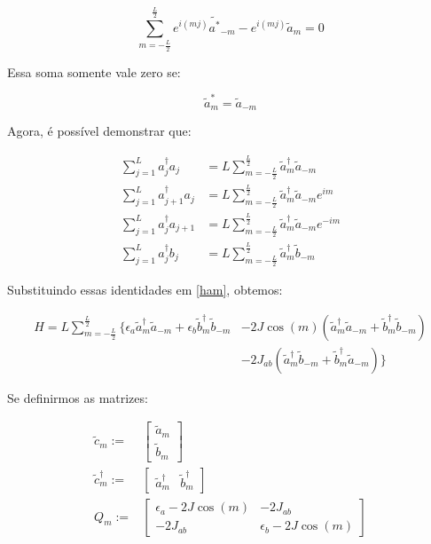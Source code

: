\begin{equation}
\sum_{m=-\frac{L}{2}}^{\frac{L}{2}} e^{i(mj)} \tilde{a^{*}}_{-m} - e^{i(mj)} \tilde{a}_m = 0
\end{equation}

Essa soma somente vale zero se:

\begin{equation}
\tilde{a}_{m}^* = \tilde{a}_{-m}
\end{equation}

Agora, é possível demonstrar que:

\begin{subequations}
\begin{align}
\sum_{j=1}^{L} a_{j}^{\dagger} a_{j} &= L\sum_{m=-\frac{L}{2}}^{\frac{L}{2}} \tilde{a}_{m}^{\dagger} \tilde{a}_{-m} \\
\sum_{j=1}^{L} a_{j+1}^{\dagger} a_{j} &= L\sum_{m=-\frac{L}{2}}^{\frac{L}{2}} \tilde{a}_{m}^{\dagger} \tilde{a}_{-m} e^{im} \\
\sum_{j=1}^{L} a_{j}^{\dagger} a_{j+1} &= L\sum_{m=-\frac{L}{2}}^{\frac{L}{2}} \tilde{a}_{m}^{\dagger} \tilde{a}_{-m} e^{-im} \\
\sum_{j=1}^{L} a_{j}^{\dagger} b_{j} &= L\sum_{m=-\frac{L}{2}}^{\frac{L}{2}} \tilde{a}_{m}^{\dagger} \tilde{b}_{-m}
\end{align}
\end{subequations}

Substituindo essas identidades em \eqref{ham}, obtemos:

\begin{equation}
\begin{split}
H = L \sum_{m=-\frac{L}{2}}^{\frac{L}{2}} \bigg\{ 
\epsilon_a \tilde{a}_{m}^{\dagger} \tilde{a}_{-m} +
\epsilon_b \tilde{b}_{m}^{\dagger} \tilde{b}_{-m}
&-2J\cos(m)
\left(
\tilde{a}_{m}^{\dagger} \tilde{a}_{-m} +
\tilde{b}_{m}^{\dagger} \tilde{b}_{-m}
\right) \\
& -2J_{ab} \left(
\tilde{a}_{m}^{\dagger} \tilde{b}_{-m} +
\tilde{b}_{m}^{\dagger} \tilde{a}_{-m}
\right)
\bigg\}
\end{split}
\label{newham}
\end{equation}

Se definirmos as matrizes:

\begin{subequations}
\begin{align}
\tilde{c}_{m} :=&
\begin{bmatrix}
\tilde{a}_{m} \\
\tilde{b}_{m}
\end{bmatrix} \\
\tilde{c}_{m}^{\dagger} :=&
\begin{bmatrix}
\tilde{a}_{m}^{\dagger} &
\tilde{b}_{m}^{\dagger}
\end{bmatrix} \\
Q_{m} :=&
\begin{bmatrix}
\epsilon_a -2J\cos(m) & -2J_{ab} \\
-2J_{ab} & \epsilon_b -2J\cos(m)
\end{bmatrix}
\end{align}
\end{subequations}

